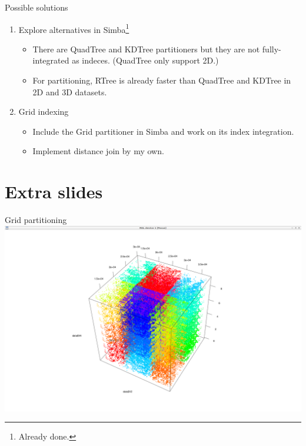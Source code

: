 \documentclass{beamer}
\theoremstyle{definition}
\begin{document}
\begin{frame}{Possible solutions}
    \begin{enumerate}
        \item Explore alternatives in Simba\footnote{Already done.}
        \begin{itemize}
            \item There are QuadTree and KDTree partitioners but they are not fully-integrated as indeces. (QuadTree only support 2D.)
            \item For partitioning, RTree is already faster than QuadTree and KDTree in 2D and 3D datasets.   
        \end{itemize}

        \item Grid indexing
        \begin{itemize}
            \item Include the Grid partitioner in Simba and work on its index integration.
            \item Implement distance join by my own.
        \end{itemize}

    \end{enumerate}
\end{frame}

\section*{Extra slides}

\begin{frame}{Grid partitioning}
    \centering
    \includegraphics[trim={4cm 4cm 4cm 4cm},clip,width=\textwidth]{grid3d}
\end{frame}
\end{document}

